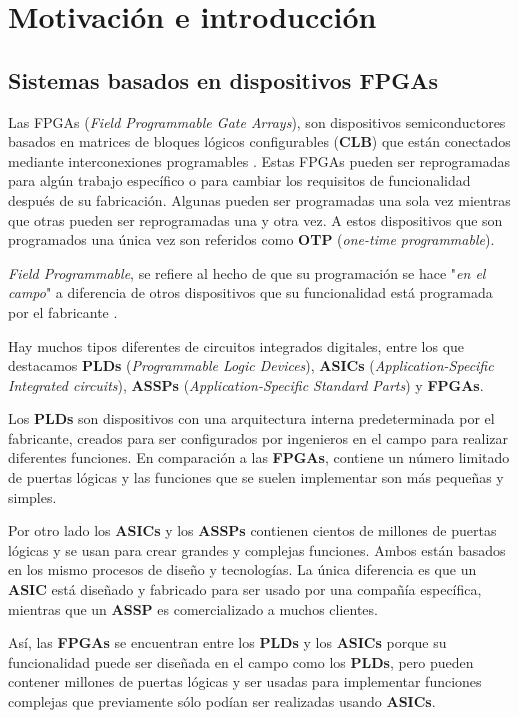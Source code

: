 \chapter{Motivación e introducción}


\section{Sistemas basados en dispositivos FPGAs} 

Las FPGAs (\textit{Field Programmable Gate Arrays}), son dispositivos semiconductores basados en matrices de bloques lógicos configurables
(\textbf{CLB}) que están conectados mediante interconexiones programables \cite{fpga_xilinx}. Estas FPGAs pueden ser reprogramadas para 
algún trabajo específico o para cambiar los requisitos de funcionalidad después de su fabricación. Algunas pueden ser programadas 
una sola vez mientras que otras pueden ser reprogramadas una y otra vez. A estos dispositivos que son programados una única vez 
son referidos como \textbf{OTP} (\textit{one-time programmable}).

\textit{Field Programmable}, se refiere al hecho de que su programación se hace "\textit{en el campo}" a diferencia de otros dispositivos 
que su funcionalidad está programada por el fabricante \cite{maxfield1}.

Hay muchos tipos diferentes de circuitos integrados digitales, entre los que destacamos \textbf{PLDs} (\textit{Programmable Logic Devices}), 
\textbf{ASICs} (\textit{Application-Specific Integrated circuits}), \textbf{ASSPs} (\textit{Application-Specific Standard Parts}) y \textbf{FPGAs}.

Los \textbf{PLDs} son dispositivos con una arquitectura interna predeterminada por el fabricante, creados para ser configurados por 
ingenieros en el campo para realizar diferentes funciones. En comparación a las \textbf{FPGAs}, contiene un número limitado de puertas lógicas 
y las funciones que se suelen implementar son más pequeñas y simples.

Por otro lado los \textbf{ASICs} y los \textbf{ASSPs} contienen cientos de millones de puertas lógicas y se usan para crear grandes y complejas 
funciones. Ambos están basados en los mismo procesos de diseño y tecnologías. La única diferencia es que un \textbf{ASIC} está diseñado y fabricado 
para ser usado por una compañía específica, mientras que un \textbf{ASSP} es comercializado a muchos clientes.

Así, las \textbf{FPGAs} se encuentran entre los \textbf{PLDs} y los \textbf{ASICs} porque su funcionalidad puede ser diseñada en el campo como 
los \textbf{PLDs}, pero pueden contener millones de puertas lógicas y ser usadas para implementar funciones complejas que previamente sólo 
podían ser realizadas usando \textbf{ASICs}. 

